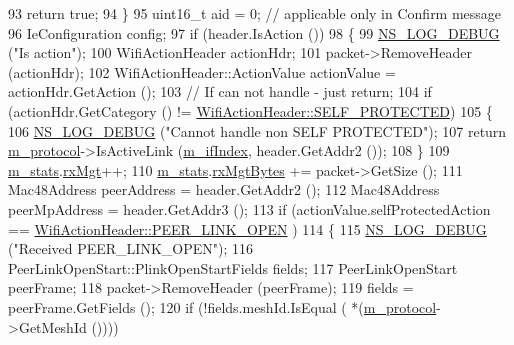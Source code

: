 \begin{DoxyCode}
93       \textcolor{keywordflow}{return} \textcolor{keyword}{true};
94     \}
95   uint16\_t aid = 0;  \textcolor{comment}{// applicable only in Confirm message}
96   IeConfiguration config;
97   \textcolor{keywordflow}{if} (header.IsAction ())
98     \{
99       \hyperlink{group__logging_ga413f1886406d49f59a6a0a89b77b4d0a}{NS\_LOG\_DEBUG} (\textcolor{stringliteral}{"Is action"});
100       WifiActionHeader actionHdr;
101       packet->RemoveHeader (actionHdr);
102       WifiActionHeader::ActionValue actionValue = actionHdr.GetAction ();
103       \textcolor{comment}{// If can not handle - just return;}
104       \textcolor{keywordflow}{if} (actionHdr.GetCategory () != \hyperlink{classns3_1_1WifiActionHeader_a5402becd11b4077f22d76c4d0d923358a0d41e6327b2a9ae590e3020f378e40e4}{WifiActionHeader::SELF\_PROTECTED})
105         \{
106           \hyperlink{group__logging_ga413f1886406d49f59a6a0a89b77b4d0a}{NS\_LOG\_DEBUG} (\textcolor{stringliteral}{"Cannot handle non SELF PROTECTED"});
107           \textcolor{keywordflow}{return} \hyperlink{classns3_1_1dot11s_1_1PeerManagementProtocolMac_afbdd1f31cd54c320267ffb3426559095}{m\_protocol}->IsActiveLink (\hyperlink{classns3_1_1dot11s_1_1PeerManagementProtocolMac_a6127e7b929975cae23d8ef639e254991}{m\_ifIndex}, header.GetAddr2 ());
108         \}
109       \hyperlink{classns3_1_1dot11s_1_1PeerManagementProtocolMac_aaaccd87941623a8bff20e8998908b518}{m\_stats}.\hyperlink{structns3_1_1dot11s_1_1PeerManagementProtocolMac_1_1Statistics_a81b9bf9b57ca90e50875074957f9fc43}{rxMgt}++;
110       \hyperlink{classns3_1_1dot11s_1_1PeerManagementProtocolMac_aaaccd87941623a8bff20e8998908b518}{m\_stats}.\hyperlink{structns3_1_1dot11s_1_1PeerManagementProtocolMac_1_1Statistics_adc42ee988c9fedca9588af7e403046f0}{rxMgtBytes} += packet->GetSize ();
111       Mac48Address peerAddress = header.GetAddr2 ();
112       Mac48Address peerMpAddress = header.GetAddr3 ();
113       \textcolor{keywordflow}{if} (actionValue.selfProtectedAction == \hyperlink{classns3_1_1WifiActionHeader_a17cfd6c8f685a44e7b7b832cc9a53e83a5d1c8a5ef38c884f951cfe32e03ca572}{WifiActionHeader::PEER\_LINK\_OPEN}
      )
114         \{
115           \hyperlink{group__logging_ga413f1886406d49f59a6a0a89b77b4d0a}{NS\_LOG\_DEBUG} (\textcolor{stringliteral}{"Received PEER\_LINK\_OPEN"});
116           PeerLinkOpenStart::PlinkOpenStartFields fields;
117           PeerLinkOpenStart peerFrame;
118           packet->RemoveHeader (peerFrame);
119           fields = peerFrame.GetFields ();
120           \textcolor{keywordflow}{if} (!fields.meshId.IsEqual ( *(\hyperlink{classns3_1_1dot11s_1_1PeerManagementProtocolMac_afbdd1f31cd54c320267ffb3426559095}{m\_protocol}->GetMeshId ())))

\end{DoxyCode}
